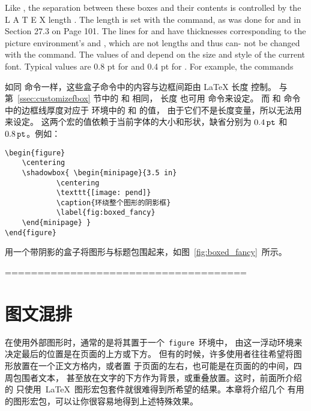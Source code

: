 Like \fbox, the separation between these boxes and their contents is controlled
by the L
A T E X length \fboxsep. The length \shadowsize is set with the \setlength
command, as was done for \fboxrule and \fboxsep in Section 27.3 on Page 101.
The lines for \ovalbox and \Ovalbox have thicknesses corresponding to the picture
environment’s \thicklines and \thinlines, which are not lengths and thus can-
not be changed with the \setlength command. The values of \thicklines and
\thinlines depend on the size and style of the current font. Typical values are
0.8 pt for \thicklines and 0.4 pt for \thinlines. For example, the commands

如同  命令一样，这些盒子命令中的内容与边框间距由 \LaTeX{} 长度  控制。
与第~\ref{ssec:customizefbox} 节中的  和  相同，
长度  也可用  命令来设定。
而  和  命令中的边框线厚度对应于  环境中的  和  的值，
由于它们不是长度变量，所以无法用  来设定。
这两个宏的值依赖于当前字体的大小和形状，缺省分别为 $0.4\,\mathtt{pt}$ 和 $0.8\,\mathtt{pt}$。例如：
\begin{lstlisting}
\begin{figure}
	\centering
	\shadowbox{ \begin{minipage}{3.5 in}
			\centering
			\texttt{[image: pend]}
			\caption{环绕整个图形的阴影框}
			\label{fig:boxed_fancy}
	\end{minipage} }
\end{figure}
\end{lstlisting}
用一个带阴影的盒子将图形与标题包围起来，如图~\ref{fig:boxed_fancy}~所示。

\begin{figure}
	\centering
\end{figure}



=====================================
\section{图文混排}

在使用外部图形时，通常的是将其置于一个~\texttt{figure}~环境中，
由这一浮动环境来决定最后的位置是在页面的上方或下方。
但有的时候，许多使用者往往希望将图形放置在一个正文方格内，或者置
于页面的左右，也可能是在页面的的中间，四周包围者文本，
甚至放在文字的下方作为背景，或重叠放置。这时，前面所介绍的
只使用~\LaTeX{}~图形宏包套件就很难得到所希望的结果。本章将介绍几个
有用的图形宏包，可以让你很容易地得到上述特殊效果。

